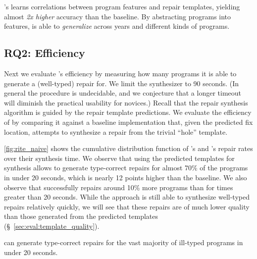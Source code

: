 \begin{framed}
  \noindent \toolname's learns correlations between program features and repair
  templates, yielding almost \emph{2x higher} accuracy than the baseline. By
  abstracting programs into features, \toolname is able to \emph{generalize}
  across years and different kinds of programs.
\end{framed}


\subsection{RQ2: Efficiency}
\label{sec:eval:efficiency}
\label{subsec:eval:man_rep_qual_eval}

Next we evaluate \toolname's efficiency by measuring how many programs it is
able to generate a (well-typed) repair for.
%
We limit the synthesizer to 90 seconds. (In general the procedure is
undecidable, and we conjecture that a longer timeout will diminish the practical
usability for novices.)
%
Recall that the repair synthesis algorithm is guided by the repair template
predictions.
%
We evaluate the efficiency of \toolname by comparing it against a baseline
\naive implementation that, given the predicted fix location, attempts to
synthesize a repair from the trivial ``hole'' template.

\autoref{fig:rite_naive} shows the cumulative distribution function of
\toolname's and \naive's repair rates over their synthesis time. We observe that
using the predicted templates for synthesis allows \toolname to generate
type-correct repairs for almost 70\% of the programs in under 20 seconds, which
is nearly 12 points higher than the \naive baseline. We also observe that
\toolname successfully repairs around 10\% more programs than \naive for times
greater than 20 seconds. While the \naive approach is still able to synthesize
well-typed repairs relatively quickly, we will see that these repairs are of
much lower quality than those generated from the predicted templates
(\S~\ref{sec:eval:template_quality}).

\begin{framed}
  \noindent \toolname can generate type-correct repairs for the vast majority of
  ill-typed programs in under 20 seconds.
\end{framed}


